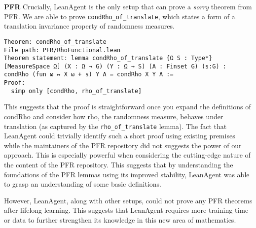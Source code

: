 \documentclass{article} %
\begin{document}





\textbf{PFR} Crucially, LeanAgent is the only setup that can prove a \textit{sorry} theorem from PFR. We are able to prove \texttt{condRho\_of\_translate}, which states a form of a translation invariance property of randomness measures.

\begin{verbatim}
Theorem: condRho_of_translate
File path: PFR/RhoFunctional.lean
Theorem statement: lemma condRho_of_translate {Ω S : Type*} [MeasureSpace Ω] (X : Ω → G) (Y : Ω → S) (A : Finset G) (s:G) : condRho (fun ω ↦ X ω + s) Y A = condRho X Y A :=
Proof:
  simp only [condRho, rho_of_translate]
\end{verbatim}

This suggests that the proof is straightforward once you expand the definitions of condRho and consider how rho, the randomness measure, behaves under translation (as captured by the \texttt{rho\_of\_translate} lemma). The fact that LeanAgent could trivially identify such a short proof using existing premises while the maintainers of the PFR repository did not suggests the power of our approach. This is especially powerful when considering the cutting-edge nature of the content of the PFR repository. This suggests that by understanding the foundations of the PFR lemmas using its improved stability, LeanAgent was able to grasp an understanding of some basic definitions.

However, LeanAgent, along with other setups, could not prove any PFR theorems after lifelong learning. This suggests that LeanAgent requires more training time or data to further strengthen its knowledge in this new area of mathematics.
\end{document}
